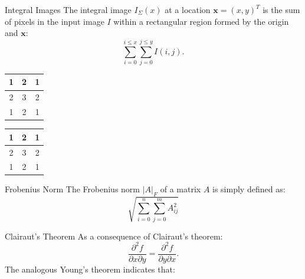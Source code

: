 \documentclass[xcolor=dvipsnames]{beamer}
\begin{document}
\begin{frame}[label=math-integral]{Integral Images}
 The integral image $I_\Sigma(x)$ at a location $\mathbf{x} = (x, y)^T$ is the sum of pixels in the input image $I$ within a rectangular region formed by the origin and $\mathbf{x}$:
 \begin{equation} \label{eq:integral}
  \sum_{i=0}^{i\leq x} \sum_{j=0}^{j\leq y} I(i,j).
 \end{equation}
\end{frame}

\begin{frame}

\begin{minipage}{.45\linewidth}
 \begin{center}
 \begin{tabular}{c|c|c}
  1 & 2 & 1 \\ \hline
  2 & 3 & 2 \\ \hline
  1 & 2 & 1 \\ \hline
 \end{tabular}
 \end{center}
\end{minipage}

\begin{minipage}{.45\linewidth}
 \begin{center}
 \begin{tabular}{c|c|c}
  1 & 2 & 1 \\ \hline
  2 & 3 & 2 \\ \hline
  1 & 2 & 1 \\ \hline
 \end{tabular}
 \end{center}
\end{minipage}

\end{frame}

\begin{frame}[label=math-frobenius]{Frobenius Norm}
The Frobenius norm $|A|_F$ of a matrix $A$ is simply defined as:
\begin{equation}
 \sqrt{\sum_{i=0}^n \sum_{j=0}^m A_{ij}^2}
\end{equation}
\end{frame}

\begin{frame}[label=math-clairaut]{Clairaut's Theorem}
 As a consequence of Clairaut's theorem:
 \begin{equation}
  \frac{\partial^2 f}{\partial x \partial y} = 
  \frac{\partial^2 f}{\partial y \partial x}.
 \end{equation}
 The analogous Young's theorem indicates that:
 \begin{equation}
 \end{equation}
\end{frame}
\end{document}
